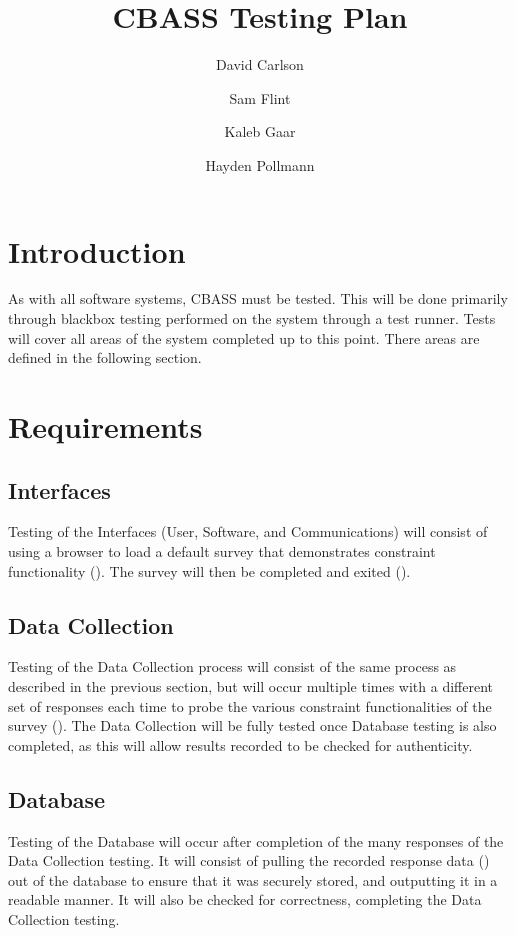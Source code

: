 \documentclass[10pt]{article}
\title{CBASS Testing Plan}
\author{David Carlson \and Sam Flint \and Kaleb Gaar \and Hayden
  Pollmann}
\begin{document}
\maketitle

\section{Introduction}

As with all software systems, CBASS must be tested. This will be done
primarily through blackbox testing performed on the system through a
test runner. Tests will cover all areas of the system completed up to
this point. There areas are defined in the following section.

\section{Requirements}

\subsection{Interfaces}
Testing of the Interfaces (User, Software, and Communications) will
consist of using a browser to load a default survey that demonstrates
constraint functionality (). The survey will then be
completed and exited ().

\subsection{Data Collection}
Testing of the Data Collection process will consist of the same
process as described in the previous section, but will occur multiple
times with a different set of responses each time to probe the various
constraint functionalities of the survey (). The
Data Collection will be fully tested once Database testing is also
completed, as this will allow results recorded to be checked for
authenticity.

\subsection{Database}
Testing of the Database will occur after completion of the many
responses of the Data Collection testing. It will consist of pulling
the recorded response data () out of the database to
ensure that it was securely stored, and outputting it in a readable
manner. It will also be checked for correctness, completing the Data
Collection testing.
\end{document}
